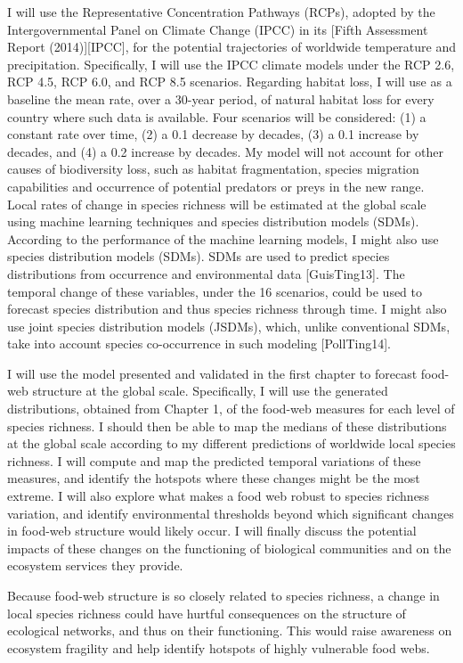 I will use the Representative
Concentration Pathways (RCPs), adopted by the Intergovernmental Panel on Climate
Change (IPCC) in its [Fifth Assessment Report (2014)][IPCC], for the potential
trajectories of worldwide temperature and precipitation. Specifically, I will
use the IPCC climate models under the RCP 2.6, RCP 4.5, RCP 6.0, and RCP 8.5
scenarios. Regarding habitat loss, I will use as a baseline the mean rate, over a 30-year
period, of natural habitat loss for every country where such data is available.
Four scenarios will be considered: (1) a constant rate over time, (2) a 0.1
decrease by decades, (3) a 0.1 increase by decades, and (4) a 0.2 increase by
decades. My model will not account for other causes of biodiversity loss, such as habitat
fragmentation, species migration capabilities and occurrence of potential
predators or preys in the new range. Local rates of change in species richness will be
estimated at the global scale using machine learning techniques and species
distribution models (SDMs). According to the performance of the machine learning models, I might also use
species distribution models (SDMs). SDMs are used to predict species
distributions  from occurrence and environmental data [GuisTing13]. The temporal
change of these variables, under the 16 scenarios, could be used to forecast
species distribution and thus species richness through time. I might also use
joint species distribution models (JSDMs), which, unlike conventional SDMs, take
into account species co-occurrence in such modeling [PollTing14].

I will use the model presented and validated in
the first chapter to forecast food-web structure at the global scale.
Specifically, I will use the generated distributions, obtained from Chapter 1,
of the food-web measures for each level of species richness. I should then be
able to map the medians of these distributions at the global scale according to
my different predictions of worldwide local species richness. I will compute and map the predicted temporal variations of these measures, and
identify the hotspots where these changes might be the most extreme. I will also
explore what makes a food web robust to species richness variation, and identify
environmental thresholds beyond which significant changes in food-web structure
would likely occur. I will finally discuss the potential impacts of these changes on the functioning
of biological communities and on the ecosystem services they provide.

Because food-web structure
is so closely related to species richness, a change in local species richness
could have hurtful consequences on the structure of ecological networks, and
thus on their functioning. This would raise awareness on ecosystem fragility and help
identify hotspots of highly vulnerable food webs.

